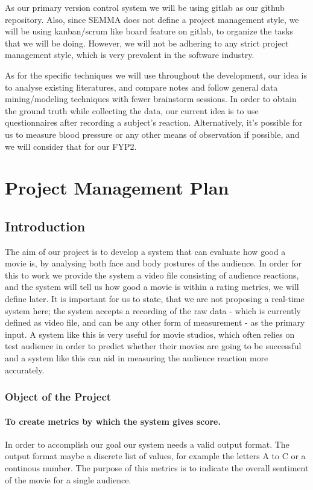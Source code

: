\documentclass[12pt,a4paper,man]{report}
\begin{document}
As our primary version control system we will be using gitlab as our github repository. Also, since SEMMA does not define a project management style, we will be using kanban/scrum like board feature on gitlab, to organize the tasks that we will be doing. However, we will not be adhering to any strict project management style, which is very prevalent in the software industry.

As for the specific techniques we will use throughout the development, our idea is to analyse existing literatures, and compare notes and follow general data mining/modeling techniques with fewer brainstorm sessions. In order to obtain the ground truth while collecting the data, our current idea is to use questionnaires after recording a subject’s reaction. Alternatively, it’s possible for us to measure blood pressure or any other means of observation if possible, and we will consider that for our FYP2.

\part{Project Management Plan}
\label{sec:org9f5bd3a}
\chapter{Introduction}
\label{sec:org6f96d03}
The aim of our project is to develop a system that can evaluate how good a movie is, by analysing both face and body postures of the audience. In order for this to work we provide the system a video file consisting of audience reactions, and the system will tell us how good a movie is within a rating metrics, we will define later. It is important for us to state, that we are not proposing a real-time system here; the system accepts a recording of the raw data - which is currently defined as video file, and can be any other form of measurement - as the primary input. A system like this is very useful for movie studios, which often relies on test audience in order to predict whether their movies are going to be successful and a system like this can aid in measuring the audience reaction more accurately. 

\section{Object of the Project}
\label{sec:orgfe9afc7}
\subsection{To create metrics by which the system gives score.}
\label{sec:org33a0bd3}
In order to accomplish our goal our system needs a valid output format. The output format maybe a discrete list of values, for example the letters A to C or a continous number. The purpose of this metrics is to indicate the overall sentiment of the movie for a single audience. 
\end{document}
